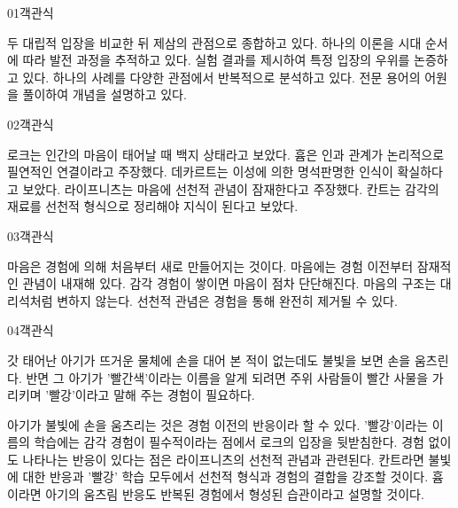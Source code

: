\documentclass[fs85,seriesWit]{korfarm-base}
\begin{document}
\kfBeginMC
\begin{kfQBlock}{01}{객관식}
\begin{kfChoices}
\kfChoice 두 대립적 입장을 비교한 뒤 제삼의 관점으로 종합하고 있다.
\kfChoice 하나의 이론을 시대 순서에 따라 발전 과정을 추적하고 있다.
\kfChoice 실험 결과를 제시하여 특정 입장의 우위를 논증하고 있다.
\kfChoice 하나의 사례를 다양한 관점에서 반복적으로 분석하고 있다.
\kfChoice 전문 용어의 어원을 풀이하여 개념을 설명하고 있다.
\end{kfChoices}
\end{kfQBlock}

\begin{kfQBlock}{02}{객관식}
\begin{kfChoices}
\kfChoice 로크는 인간의 마음이 태어날 때 백지 상태라고 보았다.
\kfChoice 흄은 인과 관계가 논리적으로 필연적인 연결이라고 주장했다.
\kfChoice 데카르트는 이성에 의한 명석판명한 인식이 확실하다고 보았다.
\kfChoice 라이프니츠는 마음에 선천적 관념이 잠재한다고 주장했다.
\kfChoice 칸트는 감각의 재료를 선천적 형식으로 정리해야 지식이 된다고 보았다.
\end{kfChoices}
\end{kfQBlock}

\begin{kfQBlock}{03}{객관식}
\begin{kfChoices}
\kfChoice 마음은 경험에 의해 처음부터 새로 만들어지는 것이다.
\kfChoice 마음에는 경험 이전부터 잠재적인 관념이 내재해 있다.
\kfChoice 감각 경험이 쌓이면 마음이 점차 단단해진다.
\kfChoice 마음의 구조는 대리석처럼 변하지 않는다.
\kfChoice 선천적 관념은 경험을 통해 완전히 제거될 수 있다.
\end{kfChoices}
\end{kfQBlock}

\begin{kfQBlock}{04}{객관식}
\begin{kfEvidence}갓 태어난 아기가 뜨거운 물체에 손을 대어 본 적이 없는데도 불빛을 보면 손을 움츠린다. 반면 그 아기가 '빨간색'이라는 이름을 알게 되려면 주위 사람들이 빨간 사물을 가리키며 '빨강'이라고 말해 주는 경험이 필요하다.\end{kfEvidence}
\begin{kfChoices}
\kfChoice 아기가 불빛에 손을 움츠리는 것은 경험 이전의 반응이라 할 수 있다.
\kfChoice '빨강'이라는 이름의 학습에는 감각 경험이 필수적이라는 점에서 로크의 입장을 뒷받침한다.
\kfChoice 경험 없이도 나타나는 반응이 있다는 점은 라이프니츠의 선천적 관념과 관련된다.
\kfChoice 칸트라면 불빛에 대한 반응과 '빨강' 학습 모두에서 선천적 형식과 경험의 결합을 강조할 것이다.
\kfChoice 흄이라면 아기의 움츠림 반응도 반복된 경험에서 형성된 습관이라고 설명할 것이다.
\end{kfChoices}
\end{kfQBlock}
\end{document}
